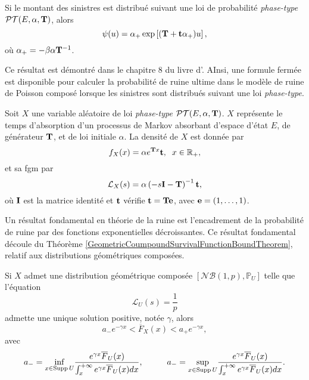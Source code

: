 \begin{Theo}\label{RuinProbabilityPhaseTypeTheo}
Si le montant des sinistres est distribué suivant une loi de probabilité \textit{phase-type} $\mathcal{PT}(E,\alpha,\bold{T})$, alors
\begin{equation}\label{RuinProbabilityPhaseType}
\psi(u)=\alpha_{+}\exp\left[(\bold{T}+\bold{t}\alpha_{+})u\right],
\end{equation} 
où $\alpha_{+}=-\beta\alpha\bold{T}^{-1}$.
\end{Theo}
Ce résultat est démontré dans le chapitre $8$ du livre d\rq{}\citet{AsAl10}. AInsi, une formule fermée est disponible pour calculer la probabilité de ruine ultime dans le modèle de ruine de Poisson composé lorsque les sinistres sont distribués suivant une loi \textit{phase-type}. 
\begin{Def}
Soit $X$ une variable aléatoire de loi \textit{phase-type} $\mathcal{PT}(E,\alpha,\bold{T})$. $X$ représente le temps d'absorption d'un processus de Markov absorbant d'espace d'état $E$, de générateur $\bold{T}$, et de loi initiale $\alpha$. La densité de $X$ est donnée par 
\begin{equation}\label{DensityPhaseType}
f_{X}(x)=\alpha e^{\bold{T}x}\bold{t},\hspace{0.2cm}x\in\mathbb{R}_{+},
\end{equation}
et sa \gls{fgm} par 
\begin{equation}\label{fgmPhaseType}
\mathcal{L}_{X}(s)=\alpha\left(-s\bold{I}-\bold{T}\right)^{-1}\bold{t},
\end{equation}
où $\bold{I}$ est la matrice identité et $\bold{t}$ vérifie $\bold{t}=\bold{T}\bold{e}$, avec $\bold{e}=(1,\ldots,1)$.
\end{Def}
Un résultat fondamental en théorie de la ruine est l\rq{}encadrement de la probabilité de ruine par des fonctions exponentielles décroissantes. Ce résultat fondamental découle du Théorème \ref{GeometricCoumpoundSurvivalFunctionBoundTheorem}, relatif aux distributions géométriques composées.
\begin{Theo}\label{GeometricCoumpoundSurvivalFunctionBoundTheorem}
Si $X$ admet une distribution géométrique composée $\left[\mathcal{NB}(1,p), \mathbb{P}_{U}\right]$ telle que l'équation
\begin{equation}\label{LundbergEquation1}
\mathcal{L}_{U}(s)=\frac{1}{p}
\end{equation}
admette une unique solution positive, notée $\gamma$, alors 
\begin{equation}\label{GeometricCoumpoundSurvivalFunctionBoundEquation}
a_{-}e^{-\gamma x}<\overline{F}_{X}(x)<a_{+}e^{-\gamma x},
\end{equation}
avec 
\begin{equation}
a_{-}=\underset{x\in\text{Supp}\hspace{0.05cm}U}{\inf}\frac{e^{\gamma x}\overline{F}_{U}(x)}{\int_{x}^{+\infty}e^{\gamma x}\overline{F}_{U}(x)dx},\hspace{1cm} a_{-}=\underset{x\in\text{Supp}\hspace{0.05cm}U}{\sup}\frac{e^{\gamma x}\overline{F}_{U}(x)}{\int_{x}^{+\infty}e^{\gamma x}\overline{F}_{U}(x)dx}.
\end{equation}
\end{Theo}
